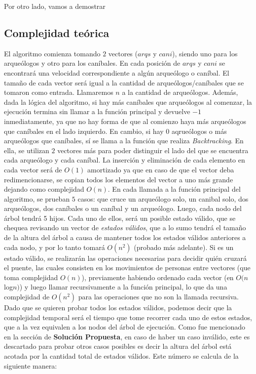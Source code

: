       Por otro lado, vamos a demostrar  



    \subsection{Complejidad teórica}

      El algoritmo comienza tomando $2$ vectores ($arqs$ y $cani$), siendo uno para los arqueólogos y otro para los caníbales. En cada posición de $arqs$ y $cani$ se encontrará una velocidad correspondiente a algún arqueólogo o caníbal. El tamaño de cada vector será igual a la cantidad de arqueólogos/caníbales que se tomaron como entrada. Llamaremos $n$ a la cantidad de arqueólogos. Además, dada la lógica del algoritmo, si hay más caníbales que arqueólogos al comenzar, la ejecución termina sin llamar a la función principal y devuelve $-1$ inmediatamente, ya que no hay forma de que al comienzo haya más arqueólogos que caníbales en el lado izquierdo. En cambio, si hay $0$ aqrueólogos o más arqueólogos que caníbales, sí se llama a la función que realiza \emph{Backtracking}.
      En ella, se utilizan $2$ vectores más para poder distinguir el lado del que se encuentra cada arqueólogo y cada caníbal. La inserción y eliminación de cada elemento en cada vector será de $O(1)$ amortizado ya que en caso de que el vector deba redimencionarse, se copian todos los elementos del vector a uno más grande dejando como complejidad $O(n)$.
      En cada llamada a la función principal del algoritmo, se prueban $5$ casos: que cruce un arqueólogo solo, un canibal solo, dos arqueólogos, dos caníbales o un caníbal y un arqueólogo. Luego, cada nodo del árbol tendrá 5 hijos. Cada uno de ellos, será un posible estado válido, que se chequea revisando un vector de \emph{estados válidos}, que a lo sumo tendrá el tamaño de la altura del árbol a causa de mantener todos los estados válidos anteriores a cada nodo, y por lo tanto tomará $O(n^2)$ (probado más adelante). Si es un estado válido, se realizarán las operaciones necesarias para decidir quién cruzará el puente, las cuales consisten en los movimientos de personas entre vectores (que toma complejidad $O(n)$), previamente habiendo ordenado cada vector (en $O(n $log$ n)$) y luego llamar recursivamente a la función principal, lo que da una complejidad de $O(n^2)$ para las operaciones que no son la llamada recursiva. Dado que se quieren probar todos los estados válidos, podemos decir que la complejidad temporal será el tiempo que tome recorrer cada uno de estos estados, que a la vez equivalen a los nodos del árbol de ejecución. Como fue mencionado en la sección de \textbf{Solución Propuesta}, en caso de haber un caso inválido, este es descartado para probar otros casos posibles es decir la altura del árbol está acotada por la cantidad total de estados válidos. Este número se calcula de la siguiente manera:

